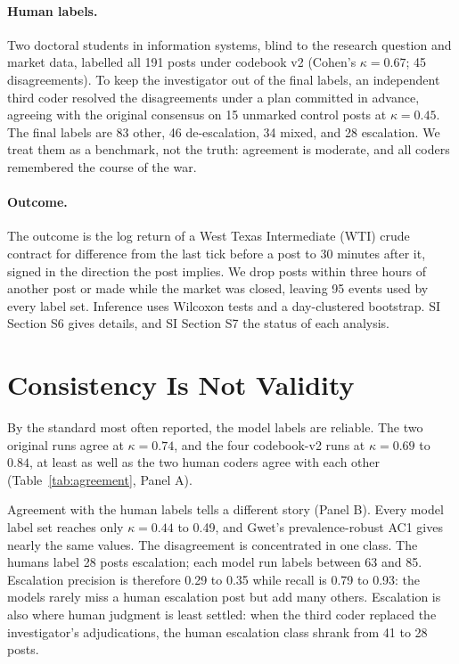 \documentclass[12pt]{article}
\begin{document}
\paragraph{Human labels.} Two doctoral students in information systems, blind to the research question and market data, labelled all 191 posts under codebook v2 (Cohen's \citeyear{cohen1960} $\kappa = 0.67$; 45 disagreements). To keep the investigator out of the final labels, an independent third coder resolved the disagreements under a plan committed in advance, agreeing with the original consensus on 15 unmarked control posts at $\kappa = 0.45$. The final labels are 83 other, 46 de-escalation, 34 mixed, and 28 escalation. We treat them as a benchmark, not the truth: agreement is moderate, and all coders remembered the course of the war.

\paragraph{Outcome.} The outcome is the log return of a West Texas Intermediate (WTI) crude contract for difference from the last tick before a post to 30 minutes after it, signed in the direction the post implies. We drop posts within three hours of another post or made while the market was closed, leaving 95 events used by every label set. Inference uses Wilcoxon tests and a day-clustered bootstrap. SI Section S6 gives details, and SI Section S7 the status of each analysis.

\section{Consistency Is Not Validity}

By the standard most often reported, the model labels are reliable. The two original runs agree at $\kappa = 0.74$, and the four codebook-v2 runs at $\kappa = 0.69$ to $0.84$, at least as well as the two human coders agree with each other (Table~\ref{tab:agreement}, Panel A).

Agreement with the human labels tells a different story (Panel B). Every model label set reaches only $\kappa = 0.44$ to 0.49, and Gwet's prevalence-robust AC1 \citep{gwet2008} gives nearly the same values. The disagreement is concentrated in one class. The humans label 28 posts escalation; each model run labels between 63 and 85. Escalation precision is therefore 0.29 to 0.35 while recall is 0.79 to 0.93: the models rarely miss a human escalation post but add many others. Escalation is also where human judgment is least settled: when the third coder replaced the investigator's adjudications, the human escalation class shrank from 41 to 28 posts.
\end{document}
